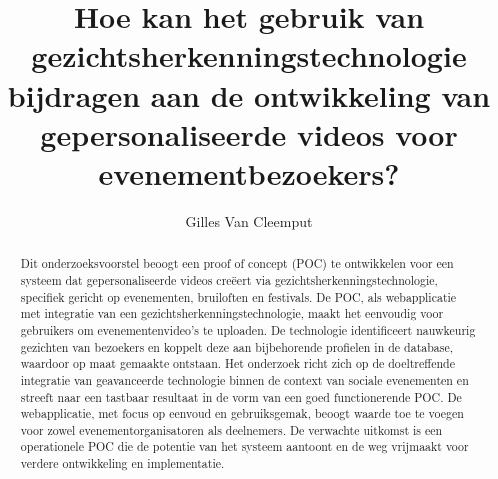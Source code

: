 \documentclass{hogent-article}
\title{Hoe kan het gebruik van gezichtsherkenningstechnologie bijdragen aan de ontwikkeling van gepersonaliseerde videos voor evenementbezoekers?}
\author{Gilles Van Cleemput}
\begin{document}
\begin{abstract}
  Dit onderzoeksvoorstel beoogt een proof of concept (POC) te ontwikkelen voor een systeem dat gepersonaliseerde videos creëert via gezichtsherkenningstechnologie,
  specifiek gericht op evenementen, bruiloften en festivals. De POC, als webapplicatie met integratie van een gezichtsherkenningstechnologie,
  maakt het eenvoudig voor gebruikers om evenementenvideo's te uploaden. De technologie identificeert nauwkeurig gezichten van bezoekers en koppelt deze aan bijbehorende
  profielen in de database, waardoor op maat gemaakte  ontstaan.
  Het onderzoek richt zich op de doeltreffende integratie van geavanceerde technologie binnen de
  context van sociale evenementen en streeft naar een tastbaar resultaat in de vorm van een goed functionerende POC.
  De webapplicatie, met focus op eenvoud en gebruiksgemak, beoogt waarde toe te voegen voor zowel evenementorganisatoren als deelnemers.
  De verwachte uitkomst is een operationele POC die de potentie van het systeem aantoont en de weg vrijmaakt voor verdere ontwikkeling en implementatie.
\end{abstract}

\tableofcontents



\printbibliography[heading=bibintoc]
\end{document}
